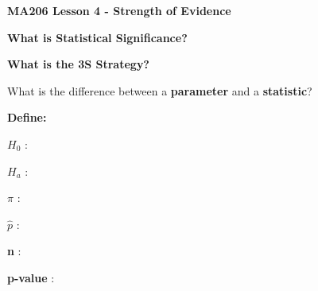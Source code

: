 \documentclass{article}
\newif\ifPrintSolution
\newcommand{\sol}[1]{\ifPrintSolution {\color{blue} #1 } \fi}
\begin{document}
\noindent \textbf{MA206 Lesson 4 - Strength of Evidence}
\vspace{.1in}


\textbf{What is Statistical Significance?}\\


\sol{Statistical Significance indicates the strength of evidence that the observed result was unlikely to have occurred by random chance}
\vfill

\textbf{What is the 3S Strategy?}

\sol{Statistic, Simulate, Strength of Evidence}
\vfill


What is the difference between a \textbf{parameter} and a \textbf{statistic}?

\sol{A parameter is the long-run behavior of a random process and it is not observable. A statistic is the summary of observed results and is used to infer about the parameter.}

\vfill

\textbf{Define:}

\hspace{.1in} \textbf{$H_0$} :\\
\sol{ Null Hypothesis, the ``Random Chance" model for the long-run behavior of the parameter.}
\vfill

\hspace{.1in} \textbf{$H_a$} :\\
\sol{ Alternate Hypothesis, the ``Something More" model for the long-run behavior of the parameter.}
\vfill

\hspace{.1in} \textbf{$\pi$} :\\
\sol{ The proportion parameter, the long-run behavior of a random process. It is unobservable.}
\vfill

\hspace{.1in} \textbf{$\hat{p}$} :\\
\sol{ The observed proportion statistic from data, used to argue or infer about the parameter}
\vfill

\hspace{.1in} \textbf{n} :\\
\sol{The sample size; The number of observations within each sample to construct the statistic}
\vfill

\hspace{.1in} \textbf{p-value} :\\
\sol{The probability of observing an observation at least as extreme as $\hat{p}$ assuming the null hypothesis is true.}
\vfill
\end{document}

